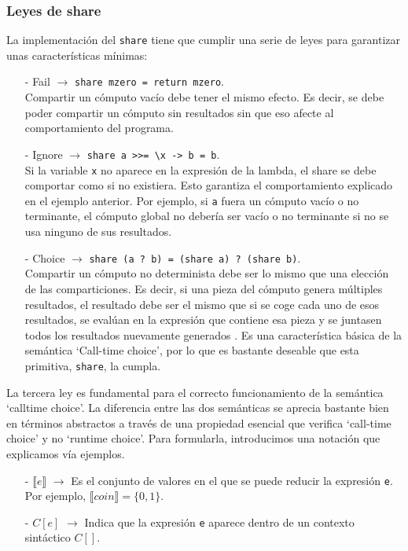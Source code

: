 \documentclass[class=article, crop=false]{standalone}
\begin{document}
\subsubsection{Leyes de share}
La implementación del \verb`share` tiene que cumplir una serie de leyes para garantizar unas
características mínimas:
\begin{itemize}
  \item[-] Fail $\rightarrow$ \verb`share mzero = return mzero`. \\
  Compartir un cómputo vacío debe tener el mismo efecto. Es decir, se debe poder compartir un
  cómputo sin resultados sin que eso afecte al comportamiento del programa.
  \item[-] Ignore $\rightarrow$ \verb`share a >>= \x -> b = b`. \\
  Si la variable \verb`x` no aparece en la expresión de la lambda, el share se debe comportar
  como si no existiera. Esto garantiza el comportamiento explicado en el ejemplo anterior.
  Por ejemplo, si \verb`a` fuera un cómputo vacío o no terminante, el cómputo global no
  debería ser vacío o no terminante si no se usa ninguno de sus resultados.
  \item[-] Choice $\rightarrow$ \verb`share (a ? b) = (share a) ? (share b)`. \\
  Compartir un cómputo no determinista debe ser lo mismo que una elección de las
  comparticiones. Es decir, si una pieza del cómputo genera múltiples resultados, el
  resultado debe ser el mismo que si se coge cada uno de esos resultados, se evalúan en la
  expresión que contiene esa pieza y se juntasen todos los resultados nuevamente generados
  \cite{lopez2007simple}\cite{baader1999term}. Es una característica básica de la semántica
  `Call-time choice', por lo que es bastante deseable que esta primitiva, \verb`share`, la
  cumpla.
\end{itemize}

La tercera ley es fundamental para el correcto funcionamiento de la semántica `calltime
choice'. La diferencia entre las dos semánticas se aprecia bastante bien en términos
abstractos a través de una propiedad esencial que verifica `call-time choice' y no `runtime
choice'. Para formularla, introducimos una notación que explicamos vía ejemplos.
\begin{itemize}
  \item[-]  $\llbracket e\rrbracket$ $\rightarrow$ Es el conjunto de valores en el que se
            puede reducir la expresión \verb`e`. Por ejemplo,
            $\llbracket coin\rrbracket = \{ 0, 1\}$.
  \item[-]  $C[e]$ $\rightarrow$ Indica que la expresión \verb`e` aparece dentro de un
            contexto sintáctico $C[]$.
\end{itemize}
\end{document}
